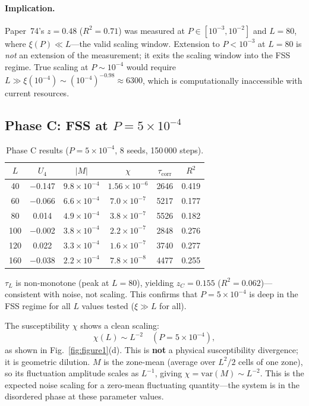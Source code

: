 \documentclass[12pt,a4paper]{article}
\begin{document}
\paragraph{Implication.}
Paper~74's $z=0.48$ ($R^2=0.71$) was measured at $P \in [10^{-3}, 10^{-2}]$ and $L=80$,
where $\xi(P) \ll L$---the valid scaling window.  Extension to $P < 10^{-3}$ at $L=80$ is
\emph{not} an extension of the measurement; it exits the scaling window into the FSS regime.
True scaling at $P \sim 10^{-4}$ would require $L \gg \xi(10^{-4}) \sim (10^{-4})^{-0.98} \approx 6300$,
which is computationally inaccessible with current resources.

\subsection{Phase C: FSS at $P=5\times10^{-4}$}

\begin{table}[h]
\centering
\caption{Phase C results ($P=5\times10^{-4}$, 8 seeds, 150\,000 steps).}
\label{tab:phaseC}
\begin{tabular}{cccccc}
\toprule
$L$ & $U_4$ & $|M|$ & $\chi$ & $\tau_\mathrm{corr}$ & $R^2$ \\
\midrule
 40 & $-$0.147 & $9.8\times10^{-4}$ & $1.56\times10^{-6}$ & 2646 & 0.419 \\
 60 & $-$0.066 & $6.6\times10^{-4}$ & $7.0\times10^{-7}$ & 5217 & 0.177 \\
 80 &   0.014  & $4.9\times10^{-4}$ & $3.8\times10^{-7}$ & 5526 & 0.182 \\
100 & $-$0.002 & $3.8\times10^{-4}$ & $2.2\times10^{-7}$ & 2848 & 0.276 \\
120 &   0.022  & $3.3\times10^{-4}$ & $1.6\times10^{-7}$ & 3740 & 0.277 \\
160 & $-$0.038 & $2.2\times10^{-4}$ & $7.8\times10^{-8}$ & 4477 & 0.255 \\
\bottomrule
\end{tabular}
\end{table}

$\tau_L$ is non-monotone (peak at $L=80$), yielding $z_C=0.155$ ($R^2=0.062$)---consistent with
noise, not scaling.  This confirms that $P=5\times10^{-4}$ is deep in the FSS regime for all
$L$ values tested ($\xi\gg L$ for all).

The susceptibility $\chi$ shows a clean scaling:
\begin{equation}
  \chi(L) \sim L^{-2} \quad (P=5\times10^{-4}),
\end{equation}
as shown in Fig.~\ref{fig:figure1}(d).  This is \textbf{not} a physical susceptibility
divergence; it is geometric dilution.  $M$ is the zone-mean (average over $L^2/2$ cells of one
zone), so its fluctuation amplitude scales as $L^{-1}$, giving $\chi = \mathrm{var}(M) \sim L^{-2}$.
This is the expected noise scaling for a zero-mean fluctuating quantity---the system is in the
disordered phase at these parameter values.
\end{document}

